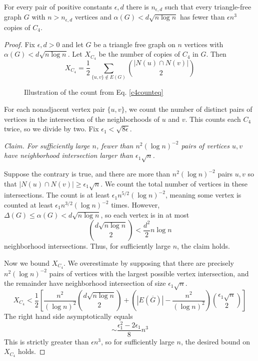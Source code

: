 \begin{lem}
For every pair of positive constants $\epsilon, d$ there is $n_{\epsilon, d}$ such that every triangle-free graph $G$ with $n > n_{\epsilon, d}$ vertices and $\alpha(G) < d\sqrt{n\log n}$ has fewer than $\epsilon n^3$ copies of $C_4$.
\end{lem}
\begin{proof}
Fix $\epsilon, d> 0$ and let $G$ be a triangle free graph on $n$ vertices with $\alpha(G) < d\sqrt{n\log n}$.  
%
Let $X_{C_4}$ be the number of copies of $C_4$ in $G$.  
%
Then
%
\begin{equation}
X_{C_4} = \frac{1}{2}\sum_{\{u,v\}\notin E(G)} {|N(u) \cap N(v)| \choose 2} 
\label{c4counteq}
\end{equation}
%
\begin{figure}
	\begin{center}
			
	\end{center}
	\label{c4count}
	\caption{Illustration of the count from Eq. \ref{c4counteq}}
\end{figure}
%
For each nonadjacent vertex pair $\{u,v\}$, we count the number of distinct pairs of vertices in the intersection of the neighborhoods of $u$ and $v$.  This counts each $C_4$ twice, so we divide by two. 
%
Fix $\epsilon_1 < \sqrt{8\epsilon}$.

\noindent\textit{Claim. For sufficiently large $n$, fewer than $n^2(\log n)^{-2}$ pairs of vertices $u,v$ have neighborhood intersection larger than $\epsilon_1\sqrt{n}$.}

Suppose the contrary is true, and there are more than $n^2(\log n)^{-2}$ pairs $u,v$ so that $|N(u)\cap N(v)| \geq \epsilon_1\sqrt{n}$.
%
We count the total number of vertices in these intersections. The count is at least $\epsilon_1n^{5/2}(\log n)^{-2}$, meaning some vertex is counted at least $\epsilon_1n^{3/2}(\log n)^{-2}$ times.  However, $\Delta(G) \leq \alpha(G) < d\sqrt{n\log n}$, so each vertex is in at most \[{d\sqrt{n\log n}\choose 2 } < \frac{d^2}{2}n\log n\] neighborhood intersections.  Thus, for sufficiently large $n$,  the claim holds.

Now we bound $X_{C_4}$.  We overestimate by supposing that there are precisely $n^2(\log n)^{-2}$ pairs of vertices with the largest possible vertex intersection, and the remainder have neighborhood intersection of size $\epsilon_1\sqrt{n}$.
\begin{equation}X_{C_4} < \frac{1}{2}\left[\frac{n^2}{(\log n)^2}{d\sqrt{n\log n}\choose 2}+ \left(|E(\overline{G})|- \frac{n^2}{(\log n)^2}\right){\epsilon_1\sqrt{n}\choose 2}\right]
\end{equation}
The right hand side asymptotically equals	
\begin{equation}
\sim \frac{\epsilon_1^2-2\epsilon_1}{8}n^3 
\end{equation}
This is strictly greater than $\epsilon n^3$, so for sufficiently large $n$, the desired bound on $X_{C_4}$ holds.
\end{proof}
 
